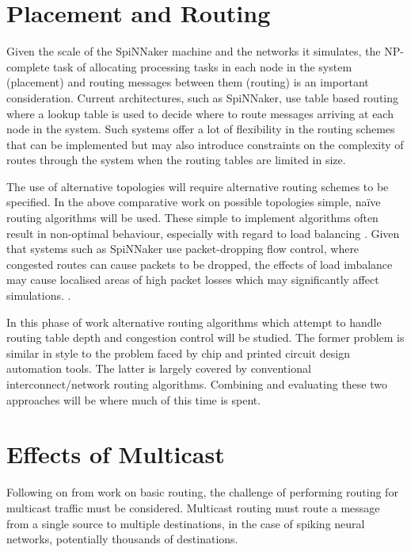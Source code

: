 	\section{Placement and Routing}
		
		Given the scale of the SpiNNaker machine and the networks it simulates, the
		NP-complete task of allocating processing tasks in each node in the system
		(placement) and routing messages between them (routing) is an important
		consideration. Current architectures, such as SpiNNaker, use table based
		routing where a lookup table is used to decide where to route messages
		arriving at each node in the system. Such systems offer a lot of flexibility
		in the routing schemes that can be implemented but may also introduce
		constraints on the complexity of routes through the system when the routing
		tables are limited in size.
		
		The use of alternative topologies will require alternative routing schemes
		to be specified. In the above comparative work on possible topologies
		simple, na\"ive routing algorithms will be used. These simple to implement
		algorithms often result in non-optimal behaviour, especially with regard to
		load balancing \cite{dally04}. Given that systems such as SpiNNaker use
		packet-dropping flow control, where congested routes can cause packets to be
		dropped, the effects of load imbalance may cause localised areas of high
		packet losses which may significantly affect simulations.
		\cite{greenfield10}.
		
		In this phase of work alternative routing algorithms which attempt to handle
		routing table depth and congestion control will be studied. The former
		problem is similar in style to the problem faced by chip and printed circuit
		design automation tools. The latter is largely covered by conventional
		interconnect/network routing algorithms. Combining and evaluating these two
		approaches will be where much of this time is spent.
	
	\section{Effects of Multicast}
		
		Following on from work on basic routing, the challenge of performing routing
		for multicast traffic must be considered. Multicast routing must route a
		message from a single source to multiple destinations, in the case of
		spiking neural networks, potentially thousands of destinations.
		
